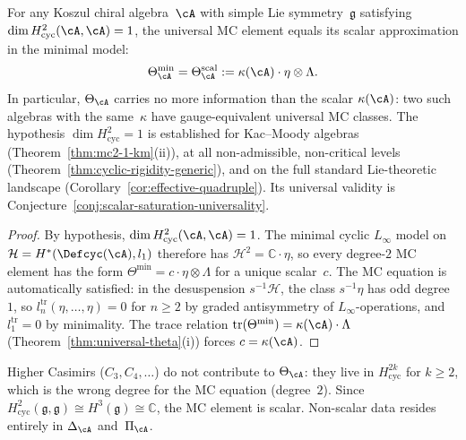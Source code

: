 \begin{corollary}
\label{cor:scalar-saturation}
For any Koszul chiral algebra~$\cA$ with simple Lie
symmetry~$\mathfrak{g}$ satisfying
$\dim H^2_{\mathrm{cyc}}(\cA,\cA) = 1$, the universal MC element
equals its scalar approximation in the minimal model:
\[
\Theta_{\cA}^{\min} = \Theta_{\cA}^{\mathrm{scal}}
:= \kappa(\cA) \cdot \eta \otimes \Lambda.
\]
In particular, $\Theta_{\cA}$ carries no more information than the
scalar $\kappa(\cA)$: two such algebras with the same~$\kappa$
have gauge-equivalent universal MC classes.
The hypothesis $\dim H^2_{\mathrm{cyc}} = 1$ is established
for Kac--Moody algebras
\textup{(}Theorem~\textup{\ref{thm:mc2-1-km}}\textup{(ii)}\textup{)},
at all non-admissible, non-critical levels
\textup{(}Theorem~\textup{\ref{thm:cyclic-rigidity-generic}}\textup{)},
and on the full standard Lie-theoretic landscape
\textup{(}Corollary~\textup{\ref{cor:effective-quadruple}}\textup{)}.
Its universal validity is
Conjecture~\textup{\ref{conj:scalar-saturation-universality}}.
\end{corollary}

\begin{proof}
By hypothesis, $\dim H^2_{\mathrm{cyc}}(\cA,\cA) = 1$.
The minimal cyclic $L_\infty$ model on
$\mathcal{H} = H^*(\Defcyc(\cA), l_1)$ therefore has
$\mathcal{H}^2 = \mathbb{C}\!\cdot\!\eta$, so every degree-$2$
MC element has the form
$\Theta^{\min} = c \cdot \eta \otimes \Lambda$ for a unique
scalar~$c$.
The MC equation is automatically satisfied: in the desuspension
$s^{-1}\mathcal{H}$, the class $s^{-1}\eta$ has odd degree~$1$,
so $l_n^{\mathrm{tr}}(\eta,\ldots,\eta) = 0$ for $n \geq 2$ by
graded antisymmetry of $L_\infty$-operations, and
$l_1^{\mathrm{tr}} = 0$ by minimality.
The trace relation
$\operatorname{tr}(\Theta^{\min}) = \kappa(\cA) \cdot \Lambda$
(Theorem~\ref{thm:universal-theta}(i)) forces $c = \kappa(\cA)$.
\end{proof}

\begin{remark}
\label{rem:scalar-saturation-casimirs}
Higher Casimirs ($C_3, C_4, \ldots$) do not contribute to
$\Theta_{\cA}$: they live in $H^{2k}_{\mathrm{cyc}}$ for
$k\geq 2$, which is the wrong degree for the MC equation (degree~$2$).
Since $H^2_{\mathrm{cyc}}(\mathfrak{g},\mathfrak{g})\cong
H^3(\mathfrak{g})\cong\mathbb{C}$, the MC element is scalar.
Non-scalar data resides entirely in $\Delta_{\cA}$ and~$\Pi_{\cA}$.
\end{remark}

